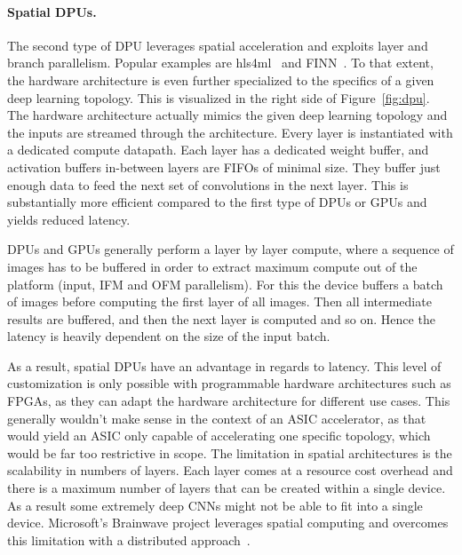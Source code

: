 \paragraph*{Spatial DPUs.} The second type of DPU leverages spatial acceleration and exploits layer and branch parallelism. Popular examples are hls4ml~\cite{hls4mldata_150p} and FINN~\cite{umuroglu2017finn,blott2018finnr}.
To that extent, the hardware architecture is even further specialized to the specifics of a given deep learning topology. 
This is visualized in the right side of Figure~\ref{fig:dpu}. 
The hardware architecture actually mimics the given deep learning topology and the inputs are streamed through the architecture. 
Every layer is instantiated with a dedicated compute datapath. 
Each layer has a dedicated weight buffer, and activation buffers in-between layers are FIFOs of minimal size. They buffer just enough data to feed the next set of convolutions in the next layer. 
This is substantially more efficient compared to the first type of DPUs or GPUs and yields reduced latency. 

DPUs and GPUs generally perform a layer by layer compute, where a sequence of images has to be buffered in order to extract maximum compute out of the platform (input, IFM and OFM parallelism). 
For this the device buffers a batch of images before computing the first layer of all images. 
Then all intermediate results are buffered, and then the next layer is computed and so on. Hence the latency is heavily dependent on the size of the input batch.

As a result, spatial DPUs have an advantage in regards to latency.
This level of customization is only possible with programmable hardware architectures such as FPGAs, as they can adapt the hardware architecture for different use cases. 
This generally wouldn't make sense in the context of an ASIC accelerator, as that would yield an ASIC only capable of accelerating one specific topology, which would be far too restrictive in scope.
The limitation in spatial architectures is the scalability in numbers of layers. 
Each layer comes at a resource cost overhead and there is a maximum number of layers that can be created within a single device. As a result some extremely deep CNNs might not be able to fit into a single device. Microsoft's Brainwave project leverages spatial computing and overcomes this limitation with a distributed approach~\cite{chung2018serving}.

